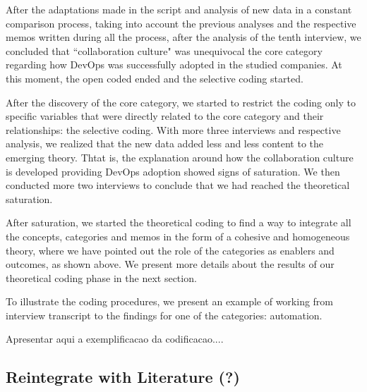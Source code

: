 After the adaptations made in the script and analysis of new data in a constant
comparison process, taking into account the previous analyses and the
respective memos written during all the process, after the analysis of the tenth
interview, we concluded that ``collaboration culture" was unequivocal the core
category regarding how DevOps was successfully adopted in the studied companies.
At this moment, the open coded ended and the selective coding started.

After the discovery of the core category, we started to restrict the coding only
to specific variables that were directly related to the core category and their
relationships: the selective coding.
With more three interviews and respective analysis, we realized that
the new data added less and less content to the emerging theory. Thtat is, the
explanation around how the collaboration culture is developed providing
DevOps adoption showed signs of saturation. We then conducted more two
interviews to conclude that we had reached the theoretical saturation.

After saturation, we started the theoretical coding to find a way to integrate
all the concepts, categories and memos in the form of a cohesive and
homogeneous theory, where we have pointed out the role of the categories as
enablers and outcomes, as shown above. We present more details about
the results of our theoretical coding phase in the next section.


To illustrate the coding procedures, we present an example of working from
interview transcript to the findings for one of the categories: automation.


Apresentar aqui a exemplificacao da codificacao....

\subsection{Reintegrate with Literature (?)}
